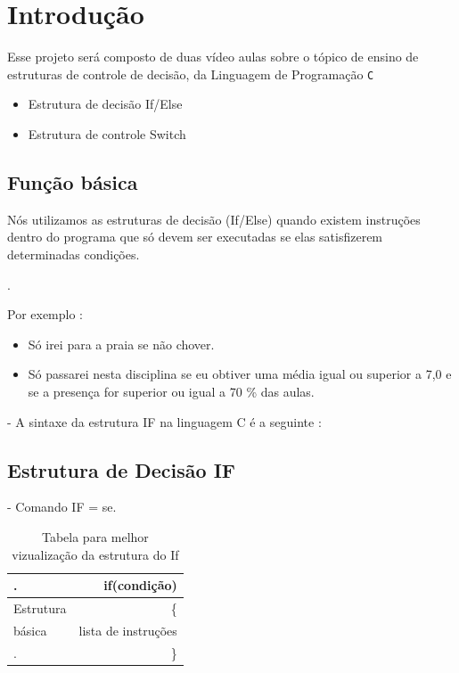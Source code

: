 \documentclass[a4paper,12pt]{article}  %
\begin{document}
\newpage

\section{Introdução}


   Esse projeto será composto de duas vídeo aulas sobre o tópico de ensino de estruturas de controle de decisão,  da Linguagem de Programação \texttt{C}

\begin{itemize}

 \item Estrutura de decisão If/Else
 \item Estrutura de controle Switch
\end{itemize}


 \subsection{Função básica}


    Nós utilizamos as estruturas de decisão (If/Else) quando existem instruções dentro do programa que só devem ser executadas se elas satisfizerem determinadas condições.

.

Por exemplo :

\begin{itemize}
               
       \item  Só irei para a praia se não chover. 
       \item  Só passarei nesta disciplina se eu obtiver uma média igual ou superior a 7,0 e se a presença for superior ou igual a 70 \% das aulas.
             
\end{itemize}

   - A sintaxe da estrutura IF na linguagem C é a seguinte :
 
 \subsection{Estrutura de Decisão IF}   
       
  -  Comando IF = se.
\begin{table}[H]
\begin{center}
 \caption{Tabela para melhor vizualização da estrutura do If}
\begin{tabular}{|l|r|}
  \hline \hline
  
  .          & if(condição) \\ \hline
  Estrutura  &  \{           \\ \hline
    básica   &   lista de instruções  \\ \hline
  .          &  \}             \\ \hline  
\end{tabular}
\label{tab:resultados}
\end{center}
\end{table}
\end{document}
